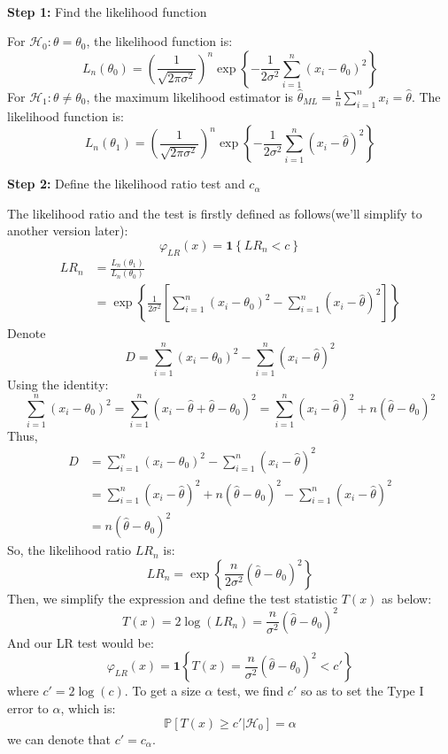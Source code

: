 \begin{solution}
    \ 

    \textbf{Step 1:} Find the likelihood function
    
    For $\mathcal{H}_0: \theta = \theta_0$, the likelihood function is:
    \[
    L_n(\theta_0) = \left(\frac{1}{\sqrt{2\pi\sigma^2}}\right)^n \exp{\left\{-\frac{1}{2\sigma^2} \sum_{i=1}^{n} (x_i - \theta_0)^2\right\}}
    \]
    For $\mathcal{H}_1: \theta \neq \theta_0$, the maximum likelihood estimator is $\hat{\theta}_{ML} = \frac{1}{n}\sum\limits_{i=1}^{n}x_i = \hat{\theta}$. The likelihood function is:
    \[
    L_n(\theta_1) = \left(\frac{1}{\sqrt{2\pi\sigma^2}}\right)^n \exp{\left\{-\frac{1}{2\sigma^2} \sum_{i=1}^{n} (x_i - \hat{\theta})^2\right\}}
    \]

    \textbf{Step 2:} Define the likelihood ratio test and $c_\alpha$

    The likelihood ratio and the test is firstly defined as follows(we'll simplify to another version later):
    \[
    \varphi_{LR}(x) = \mathbf{1}\left\{LR_n < c\right\}
    \]
    \begin{align*}
         LR_n &= \frac{L_n(\theta_1)}{L_n(\theta_0)} \\
              &= \exp{\left\{ \frac{1}{2\sigma^2}\left[\sum_{i=1}^{n} (x_i - \theta_0)^2 - \sum_{i=1}^{n} (x_i - \hat{\theta})^2\right]\right\}}
    \end{align*}
    Denote 
    \[
    D = \sum\limits_{i=1}^{n} (x_i - \theta_0)^2 - \sum\limits_{i=1}^{n} (x_i - \hat{\theta})^2
    \]
    Using the identity:
    \[
    \sum\limits_{i=1}^{n} (x_i - \theta_0)^2 = \sum\limits_{i=1}^{n} (x_i - \hat{\theta} + \hat{\theta} - \theta_0)^2 = \sum\limits_{i=1}^{n} (x_i - \hat{\theta})^2 + n(\hat{\theta} - \theta_0)^2
    \]
    Thus, 
    \begin{align*}
        D &= \sum\limits_{i=1}^{n} (x_i - \theta_0)^2 - \sum\limits_{i=1}^{n} (x_i - \hat{\theta})^2 \\
          &= \sum\limits_{i=1}^{n} (x_i - \hat{\theta})^2 + n(\hat{\theta} - \theta_0)^2 - \sum\limits_{i=1}^{n} (x_i - \hat{\theta})^2 \\
          &= n(\hat{\theta} - \theta_0)^2
    \end{align*}
    So, the likelihood ratio $LR_n$ is:
    \[
    LR_n = \exp{\left\{\frac{n}{2\sigma^2} (\hat{\theta} - \theta_0)^2\right\}}
    \]
    Then, we simplify the expression and define the test statistic $T(x)$ as below:
    \[
    T(x) = 2\log{(LR_n)} = \frac{n}{\sigma^2}(\hat{\theta} - \theta_0)^2
    \]
    And our LR test would be:
    \[
    \varphi_{LR}(x) = \mathbf{1}\left\{ T(x) = \frac{n}{\sigma^2}(\hat{\theta} - \theta_0)^2 < c'\right\}
    \]
    where $c' = 2\log(c)$.
    To get a size $\alpha$ test, we find $c'$ so as to set the Type I error to $\alpha$, which is:
    \[
    \mathbb{P}\left[ T(x) \geq c' | \mathcal{H}_0\right] = \alpha
    \]
    we can denote that $c' = c_\alpha$.


\end{solution}
